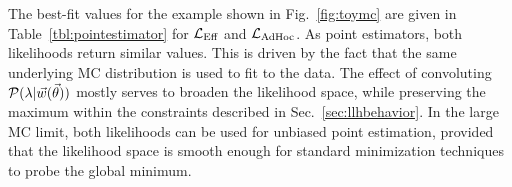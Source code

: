 The best-fit values for the example shown in Fig.~\ref{fig:toymc} are given in Table~\ref{tbl:pointestimator} for $\mathcal{L}_\textmd{Eff}$ and $\mathcal{L}_{\textmd{AdHoc}}$. As point estimators, both likelihoods return similar values. This is driven by the fact that the same underlying MC distribution is used to fit to the data. The effect of convoluting $\mathcal{P}(\lambda|\vec{w}(\vec{\theta}))$ mostly serves to broaden the likelihood space, while preserving the maximum within the constraints described in Sec.~\ref{sec:llhbehavior}. In the large MC limit, both likelihoods can be used for unbiased point estimation, provided that the likelihood space is smooth enough for standard minimization techniques to probe the global minimum.
